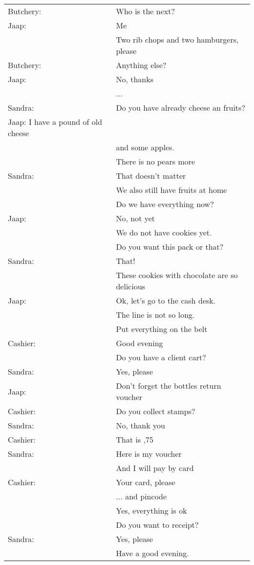 \documentclass{tstextbook}
\begin{document}
		\begin{definition}
			\begin{tabular}{ll}
			Butchery: & Who is the next? \\
			Jaap: & Me \\
			& Two rib chops and two hamburgers, please \\
			Butchery: & Anything else? \\
			Jaap: & No, thanks \\
			& ... \\	
			Sandra: & Do you have already cheese an fruits? \\
			Jaap: I have a pound of old cheese \\
			& and some apples. \\
			& There is no pears more \\
			Sandra: & That doesn't matter \\
			& We also still have fruits at home \\
			& Do we have everything now? \\
			Jaap: & No, not yet \\
			& We do not have cookies yet. \\
			& Do you want this pack or that? \\
			Sandra: & That! \\
			& These cookies with chocolate are so delicious \\
			Jaap: & Ok, let's go to the cash desk. \\
			& The line is not so long.\\
			& Put everything on the belt \\
			Cashier: & Good evening \\
			& Do you have a client cart? \\
			Sandra: & Yes, please \\
			Jaap: & Don't forget the bottles return voucher \\
			Cashier: & Do you collect stamps? \\
			Sandra: & No, thank you \\
			Cashier: & That is \texteuro 51,75 \\
			Sandra: & Here is my voucher \\
			& And I will pay by card \\
			Cashier: & Your card, please \\
			& ... and pincode \\
			& Yes, everything is ok \\
			& Do you want to receipt? \\
			Sandra: & Yes, please \\
			& Have a good evening.
		\end{tabular}
	\end{definition}
	
\end{document}
